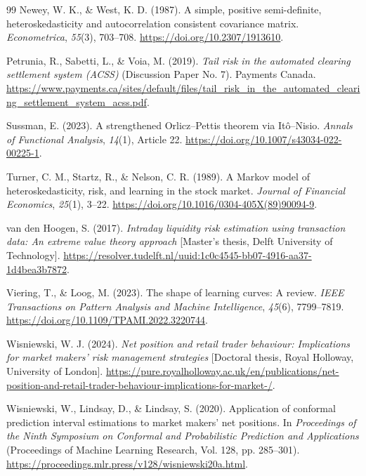 \documentclass[11pt,a4paper]{article}
\begin{document}
\begin{thebibliography}{99}
 Newey, W. K., \& West, K. D. (1987). A simple, positive semi-definite, heteroskedasticity and autocorrelation consistent covariance matrix. \emph{Econometrica}, \emph{55}(3), 703--708. \url{https://doi.org/10.2307/1913610}.

 Petrunia, R., Sabetti, L., \& Voia, M. (2019). \emph{Tail risk in the automated clearing settlement system (ACSS)} (Discussion Paper No. 7). Payments Canada. \url{https://www.payments.ca/sites/default/files/tail_risk_in_the_automated_clearing_settlement_system_acss.pdf}.

 Sussman, E. (2023). A strengthened Orlicz--Pettis theorem via Itô--Nisio. \emph{Annals of Functional Analysis}, \emph{14}(1), Article 22. \url{https://doi.org/10.1007/s43034-022-00225-1}.

 Turner, C. M., Startz, R., \& Nelson, C. R. (1989). A Markov model of heteroskedasticity, risk, and learning in the stock market. \emph{Journal of Financial Economics}, \emph{25}(1), 3--22. \url{https://doi.org/10.1016/0304-405X(89)90094-9}.

 van den Hoogen, S. (2017). \emph{Intraday liquidity risk estimation using transaction data: An extreme value theory approach} [Master's thesis, Delft University of Technology]. \url{https://resolver.tudelft.nl/uuid:1c0c4545-bb07-4916-aa37-1d4bea3b7872}.

 Viering, T., \& Loog, M. (2023). The shape of learning curves: A review. \emph{IEEE Transactions on Pattern Analysis and Machine Intelligence}, \emph{45}(6), 7799--7819. \url{https://doi.org/10.1109/TPAMI.2022.3220744}.

 Wisniewski, W. J. (2024). \emph{Net position and retail trader behaviour: Implications for market makers' risk management strategies} [Doctoral thesis, Royal Holloway, University of London]. \url{https://pure.royalholloway.ac.uk/en/publications/net-position-and-retail-trader-behaviour-implications-for-market-/}.

 Wisniewski, W., Lindsay, D., \& Lindsay, S. (2020). Application of conformal prediction interval estimations to market makers' net positions. In \emph{Proceedings of the Ninth Symposium on Conformal and Probabilistic Prediction and Applications} (Proceedings of Machine Learning Research, Vol. 128, pp. 285--301). \url{https://proceedings.mlr.press/v128/wisniewski20a.html}.
\end{thebibliography}
\end{document}
